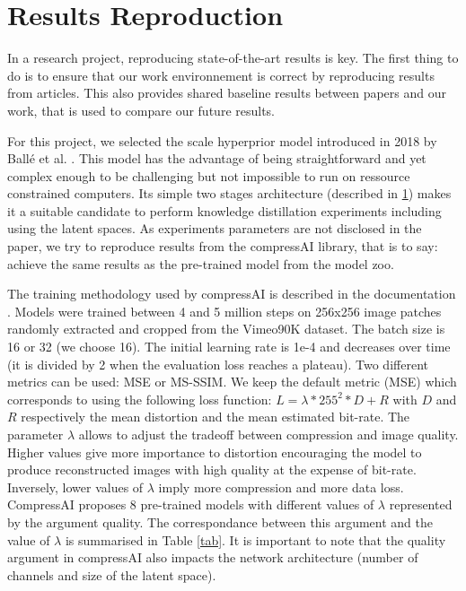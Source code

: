 \section{Results Reproduction}
In a research project, reproducing state-of-the-art results is key. The first thing to do is to ensure that our work environnement is correct by reproducing results from articles. This also provides shared baseline results between papers and our work, that is used to compare our future results.

For this project, we selected the scale hyperprior model introduced in 2018 by Ballé et al. \cite{ballé2018variationalimagecompressionscale}. This model has the advantage of being straightforward and yet complex enough to be challenging but not impossible to run on ressource constrained computers. Its simple two stages architecture (described in \ref{}) makes it a suitable candidate to perform knowledge distillation experiments including using the latent spaces. As experiments parameters are not disclosed in the paper, we try to reproduce results from the compressAI library, that is to say: achieve the same results as the pre-trained model from the model zoo.

The training methodology used by compressAI is described in the documentation \cite{compressai_train}. Models were trained between 4 and 5 million steps on 256x256 image patches randomly extracted and cropped from the Vimeo90K dataset. The batch size is 16 or 32 (we choose 16). The initial learning rate is 1e-4 and decreases over time (it is divided by 2 when the evaluation loss reaches a plateau). Two different metrics can be used: MSE or MS-SSIM. We keep the default metric (MSE) which corresponds to using the following loss function: \(L = \lambda * 255^{2} * D + R\) with \(D\) and \(R\) respectively the mean distortion and the mean estimated bit-rate. The parameter \(\lambda\) allows to adjust the tradeoff between compression and image quality. Higher values give more importance to distortion encouraging the model to produce reconstructed images with high quality at the expense of bit-rate. Inversely, lower values of \(\lambda\) imply more compression and more data loss. CompressAI proposes 8 pre-trained models with different values of \(\lambda\) represented by the argument \textsf{quality}. The correspondance between this argument and the value of \(\lambda\) is summarised in Table \ref{tab}. It is important to note that the \textsf{quality} argument in compressAI also impacts the network architecture (number of channels and size of the latent space).

